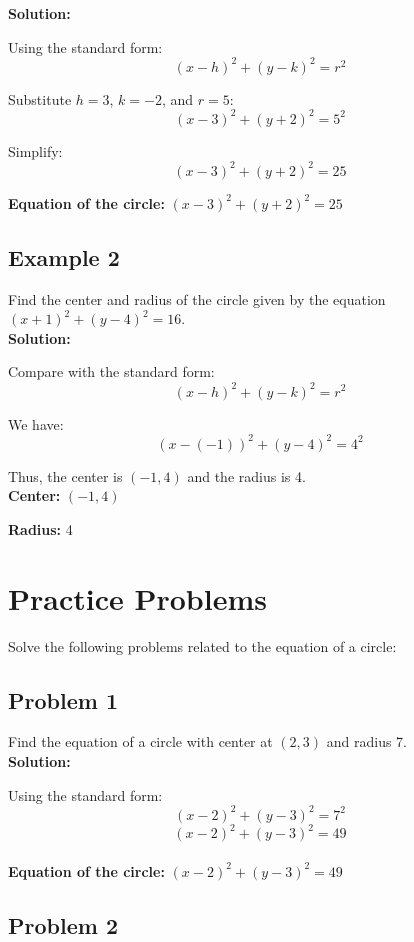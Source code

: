\documentclass[12pt]{article}
\begin{document}
\textbf{Solution:}

Using the standard form:
\[
(x - h)^2 + (y - k)^2 = r^2
\]

Substitute \( h = 3 \), \( k = -2 \), and \( r = 5 \):
\[
(x - 3)^2 + (y + 2)^2 = 5^2
\]

Simplify:
\[
(x - 3)^2 + (y + 2)^2 = 25
\]

\textbf{Equation of the circle:} \( (x - 3)^2 + (y + 2)^2 = 25 \)

\subsection*{Example 2}

Find the center and radius of the circle given by the equation \( (x + 1)^2 + (y - 4)^2 = 16 \).\\

\textbf{Solution:}

Compare with the standard form:
\[
(x - h)^2 + (y - k)^2 = r^2
\]

We have:
\[
(x - (-1))^2 + (y - 4)^2 = 4^2
\]

Thus, the center is \( (-1, 4) \) and the radius is 4.\\

\textbf{Center:} \( (-1, 4) \)

\textbf{Radius:} 4

\newpage

\section*{Practice Problems}

Solve the following problems related to the equation of a circle:

\subsection*{Problem 1}

Find the equation of a circle with center at \( (2, 3) \) and radius 7.\\

\textbf{Solution:}

Using the standard form:
\[
(x - 2)^2 + (y - 3)^2 = 7^2
\]
\[
(x - 2)^2 + (y - 3)^2 = 49
\]\\

\textbf{Equation of the circle:} \( (x - 2)^2 + (y - 3)^2 = 49 \)

\subsection*{Problem 2}
\end{document}
